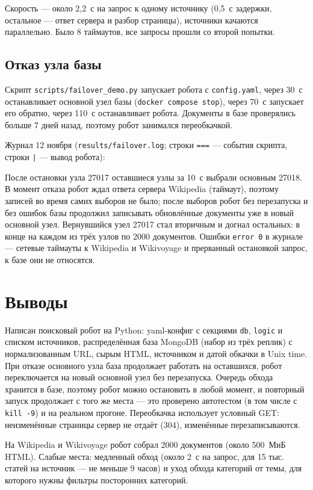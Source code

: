Скорость --- около 2,2~с на запрос к одному источнику (0,5~с задержки, остальное --- ответ сервера и разбор страницы), источники качаются параллельно. Было 8 таймаутов, все запросы прошли со второй попытки.

\subsection{Отказ узла базы}
Скрипт \texttt{scripts/failover\_demo.py} запускает робота с \texttt{config.yaml}, через 30~с останавливает основной узел базы (\texttt{docker compose stop}), через 70~с запускает его обратно, через 110~с останавливает робота. Документы в базе проверялись больше 7 дней назад, поэтому робот занимался переобкачкой.

Журнал 12 ноября (\texttt{results/failover.log}; строки \texttt{===} --- события скрипта, строки \texttt{|} --- вывод робота):

{\scriptsize
{}
}

После остановки узла 27017 оставшиеся узлы за 10~с выбрали основным 27018. В момент отказа робот ждал ответа сервера Wikipedia (таймаут), поэтому записей во время самих выборов не было; после выборов робот без перезапуска и без ошибок базы продолжил записывать обновлённые документы уже в новый основной узел. Вернувшийся узел 27017 стал вторичным и догнал остальных: в конце на каждом из трёх узлов по 2000 документов. Ошибки \texttt{error 0} в журнале --- сетевые таймауты к Wikipedia и Wikivoyage и прерванный остановкой запрос, к базе они не относятся.

\section{Выводы}
Написан поисковый робот на Python: yaml-конфиг с секциями \texttt{db}, \texttt{logic} и списком источников, распределённая база MongoDB (набор из трёх реплик) с нормализованным URL, сырым HTML, источником и датой обкачки в Unix time. При отказе основного узла база продолжает работать на оставшихся, робот переключается на новый основной узел без перезапуска. Очередь обхода хранится в базе, поэтому робот можно остановить в любой момент, и повторный запуск продолжает с того же места --- это проверено автотестом (в том числе с \texttt{kill -9}) и на реальном прогоне. Переобкачка использует условный GET: неизменённые страницы сервер не отдаёт (304), изменённые перезаписываются.

На Wikipedia и Wikivoyage робот собрал 2000 документов (около 500~МиБ HTML). Слабые места: медленный обход (около 2~с на запрос, для 15 тыс. статей на источник --- не меньше 9 часов) и уход обхода категорий от темы, для которого нужны фильтры посторонних категорий.
\pagebreak
